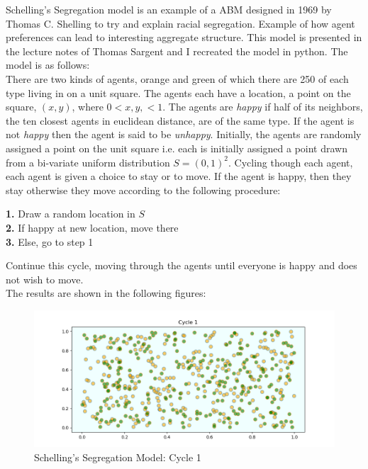 \documentclass[12pt,twoside]{reedthesis}
\begin{document}
Schelling's Segregation model is an example of a ABM designed in 1969 by Thomas C. Shelling to try and explain racial segregation. Example of how agent preferences can lead to interesting aggregate structure. This model is presented in the lecture notes of Thomas Sargent and I recreated the model in python. The model is as follows: \\

There are two kinds of agents, orange and green of which there are 250 of each type living in on a unit square. The agents each have a location, a point on the square, $(x,y)$, where $0 < x,y,<1$. The agents are \textit{happy} if half of its neighbors, the ten closest agents in euclidean distance, are of the same type. If the agent is not \textit{happy} then the agent is said to be \textit{unhappy}. Initially, the agents are randomly assigned a point on the unit square i.e. each is initially assigned a point drawn from a bi-variate uniform distribution $ S = (0,1)^2$. Cycling though each agent, each agent is given a choice to stay or to move. If the agent is happy, then they stay otherwise they move according to the following procedure:

\begin{adjustwidth}{1cm}{}
	\textbf{1.} Draw a random location in $S$ \\
	\textbf{2.} If happy at new location, move there\\
	\textbf{3.} Else, go to step 1
\end{adjustwidth}

Continue this cycle, moving through the agents until everyone is happy and does not wish to move.\\

The results are shown in the following figures: 

\begin{figure}[h!]
	\centering
	\includegraphics[scale=0.5]{segregation_1}
	\caption{Schelling's Segregation Model: Cycle 1}
	\label{SSM1}
\end{figure}
\end{document}
